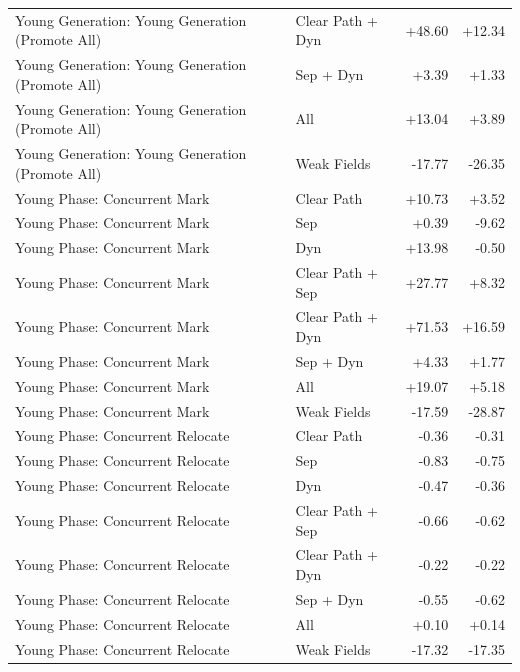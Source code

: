 \begin{table}[t]
\begin{tabular}{llrr}
Young Generation: Young Generation (Promote All) & Clear Path + Dyn & +48.60 & +12.34 \\
Young Generation: Young Generation (Promote All) & Sep + Dyn & +3.39 & +1.33 \\
Young Generation: Young Generation (Promote All) & All & +13.04 & +3.89 \\
Young Generation: Young Generation (Promote All) & Weak Fields & -17.77 & -26.35 \\
Young Phase: Concurrent Mark & Clear Path & +10.73 & +3.52 \\
Young Phase: Concurrent Mark & Sep & +0.39 & -9.62 \\
Young Phase: Concurrent Mark & Dyn & +13.98 & -0.50 \\
Young Phase: Concurrent Mark & Clear Path + Sep & +27.77 & +8.32 \\
Young Phase: Concurrent Mark & Clear Path + Dyn & +71.53 & +16.59 \\
Young Phase: Concurrent Mark & Sep + Dyn & +4.33 & +1.77 \\
Young Phase: Concurrent Mark & All & +19.07 & +5.18 \\
Young Phase: Concurrent Mark & Weak Fields & -17.59 & -28.87 \\
Young Phase: Concurrent Relocate & Clear Path & -0.36 & -0.31 \\
Young Phase: Concurrent Relocate & Sep & -0.83 & -0.75 \\
Young Phase: Concurrent Relocate & Dyn & -0.47 & -0.36 \\
Young Phase: Concurrent Relocate & Clear Path + Sep & -0.66 & -0.62 \\
Young Phase: Concurrent Relocate & Clear Path + Dyn & -0.22 & -0.22 \\
Young Phase: Concurrent Relocate & Sep + Dyn & -0.55 & -0.62 \\
Young Phase: Concurrent Relocate & All & +0.10 & +0.14 \\
Young Phase: Concurrent Relocate & Weak Fields & -17.32 & -17.35 \\
\bottomrule
\end{tabular}
\end{table}
